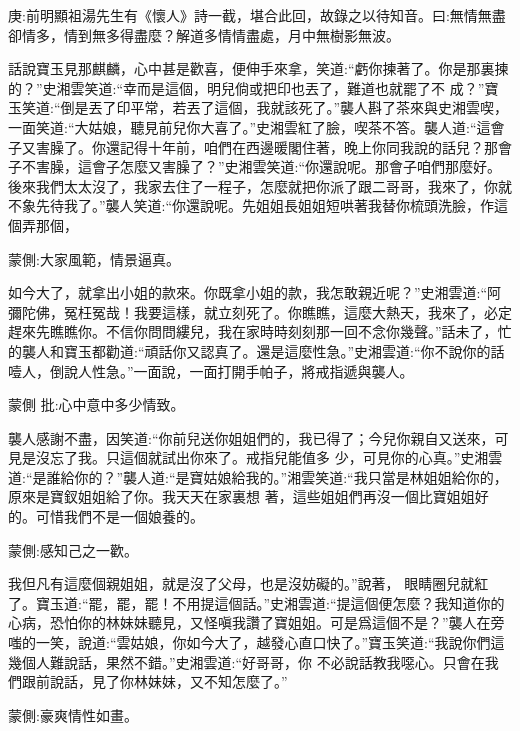 

\begin{parag}
    \begin{note}庚:前明顯祖湯先生有《懷人》詩一截，堪合此回，故錄之以待知音。曰:無情無盡卻情多，情到無多得盡麼？解道多情情盡處，月中無樹影無波。\end{note}
\end{parag}


\begin{parag}
    話說寶玉見那麒麟，心中甚是歡喜，便伸手來拿，笑道:“虧你揀著了。你是那裏揀的？”史湘雲笑道:“幸而是這個，明兒倘或把印也丟了，難道也就罷了不 成？”寶玉笑道:“倒是丟了印平常，若丟了這個，我就該死了。”襲人斟了茶來與史湘雲喫，一面笑道:“大姑娘，聽見前兒你大喜了。”史湘雲紅了臉，喫茶不答。襲人道:“這會子又害臊了。你還記得十年前，咱們在西邊暖閣住著，晚上你同我說的話兒？那會子不害臊，這會子怎麼又害臊了？”史湘雲笑道:“你還說呢。那會子咱們那麼好。後來我們太太沒了，我家去住了一程子，怎麼就把你派了跟二哥哥，我來了，你就不象先待我了。”襲人笑道:“你還說呢。先姐姐長姐姐短哄著我替你梳頭洗臉，作這個弄那個，\begin{note}蒙側:大家風範，情景逼真。\end{note}如今大了，就拿出小姐的款來。你既拿小姐的款，我怎敢親近呢？”史湘雲道:“阿彌陀佛，冤枉冤哉！我要這樣，就立刻死了。你瞧瞧，這麼大熱天，我來了，必定趕來先瞧瞧你。不信你問問縷兒，我在家時時刻刻那一回不念你幾聲。”話未了，忙的襲人和寶玉都勸道:“頑話你又認真了。還是這麼性急。”史湘雲道:“你不說你的話噎人，倒說人性急。”一面說，一面打開手帕子，將戒指遞與襲人。\begin{note}蒙側 批:心中意中多少情致。\end{note}襲人感謝不盡，因笑道:“你前兒送你姐姐們的，我已得了；今兒你親自又送來，可見是沒忘了我。只這個就試出你來了。戒指兒能值多 少，可見你的心真。”史湘雲道:“是誰給你的？”襲人道:“是寶姑娘給我的。”湘雲笑道:“我只當是林姐姐給你的，原來是寶釵姐姐給了你。我天天在家裏想 著，這些姐姐們再沒一個比寶姐姐好的。可惜我們不是一個娘養的。\begin{note}蒙側:感知己之一歡。\end{note}我但凡有這麼個親姐姐，就是沒了父母，也是沒妨礙的。”說著， 眼睛圈兒就紅了。寶玉道:“罷，罷，罷！不用提這個話。”史湘雲道:“提這個便怎麼？我知道你的心病，恐怕你的林妹妹聽見，又怪嗔我讚了寶姐姐。可是爲這個不是？”襲人在旁嗤的一笑，說道:“雲姑娘，你如今大了，越發心直口快了。”寶玉笑道:“我說你們這幾個人難說話，果然不錯。”史湘雲道:“好哥哥，你 不必說話教我噁心。只會在我們跟前說話，見了你林妹妹，又不知怎麼了。”\begin{note}蒙側:豪爽情性如畫。\end{note}
\end{parag}


